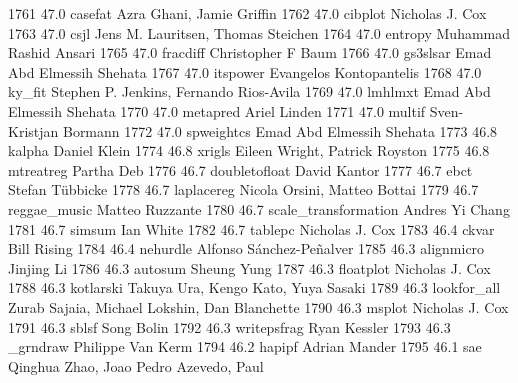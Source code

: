  1761     47.0    casefat       Azra Ghani, Jamie Griffin               
  1762     47.0    cibplot       Nicholas J. Cox                         
  1763     47.0    csjl          Jens M. Lauritsen, Thomas Steichen      
  1764     47.0    entropy       Muhammad Rashid Ansari                  
  1765     47.0    fracdiff      Christopher F Baum                      
  1766     47.0    gs3slsar      Emad Abd Elmessih Shehata               
  1767     47.0    itspower      Evangelos Kontopantelis                 
  1768     47.0    ky_fit        Stephen P. Jenkins, Fernando Rios-Avila 
  1769     47.0    lmhlmxt       Emad Abd Elmessih Shehata               
  1770     47.0    metapred      Ariel Linden                            
  1771     47.0    multif        Sven-Kristjan Bormann                   
  1772     47.0    spweightcs    Emad Abd Elmessih Shehata               
  1773     46.8    kalpha        Daniel Klein                            
  1774     46.8    xrigls        Eileen Wright, Patrick Royston          
  1775     46.8    mtreatreg     Partha Deb                              
  1776     46.7    doubletofloat  David Kantor                            
  1777     46.7    ebct          Stefan Tübbicke                        
  1778     46.7    laplacereg    Nicola Orsini, Matteo Bottai            
  1779     46.7    reggae_music  Matteo Ruzzante                         
  1780     46.7    scale_transformation  Andres Yi Chang                         
  1781     46.7    simsum        Ian White                               
  1782     46.7    tablepc       Nicholas J. Cox                         
  1783     46.4    ckvar         Bill Rising                             
  1784     46.4    nehurdle      Alfonso Sánchez-Peñalver              
  1785     46.3    alignmicro    Jinjing Li                              
  1786     46.3    autosum       Sheung Yung                             
  1787     46.3    floatplot     Nicholas J. Cox                         
  1788     46.3    kotlarski     Takuya Ura, Kengo Kato, Yuya Sasaki     
  1789     46.3    lookfor_all   Zurab Sajaia, Michael Lokshin, Dan      
                                   Blanchette                              
  1790     46.3    msplot        Nicholas J. Cox                         
  1791     46.3    sblsf         Song Bolin                              
  1792     46.3    writepsfrag   Ryan Kessler                            
  1793     46.3    _grndraw      Philippe Van Kerm                       
  1794     46.2    hapipf        Adrian Mander                           
  1795     46.1    sae           Qinghua Zhao, Joao Pedro Azevedo, Paul  
